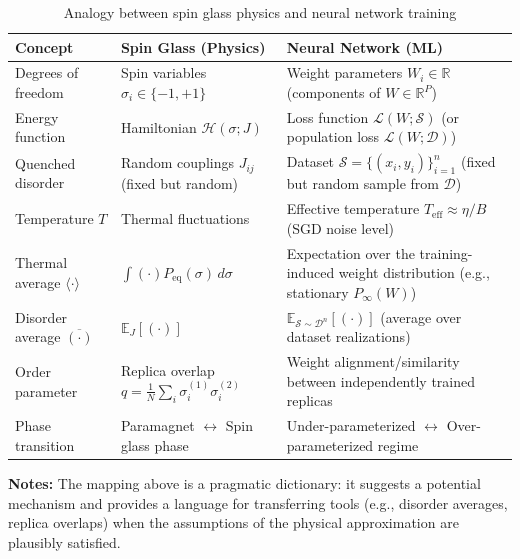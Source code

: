\documentclass[
  journal=largetwo,
  simfonts=false,
  year=2025,
  volume=37,
]{cup-journal}
\begin{document}
\begin{table}[t]
\centering
\footnotesize
\begin{threeparttable}
\caption{Analogy between spin glass physics and neural network training}
\label{tab:spin_glass_nn_analogy}
\begin{tabularx}{\textwidth}{ L{0.25\textwidth} L{0.35\textwidth} >{\RaggedRight\arraybackslash}X }
\toprule
\textbf{Concept} & \textbf{Spin Glass (Physics)} & \textbf{Neural Network (ML)} \\
\midrule
Degrees of freedom & Spin variables $\sigma_i \in \{-1,+1\}$ & Weight parameters $W_i\in\mathbb{R}$ (components of $W\in\mathbb{R}^P$) \\
\addlinespace[1pt]
Energy function & Hamiltonian $\mathcal{H}(\sigma; J)$ & Loss function $\mathcal{L}(W; \mathcal{S})$ (or population loss $\mathcal{L}(W;\mathcal{D})$) \\
\addlinespace[1pt]
Quenched disorder & Random couplings $J_{ij}$ (fixed but random) & Dataset $\mathcal{S}=\{(x_i,y_i)\}_{i=1}^n$ (fixed but random sample from $\mathcal{D}$) \\
\addlinespace[1pt]
Temperature $T$ & Thermal fluctuations & Effective temperature $T_{\text{eff}}\approx\eta/B$ (SGD noise level) \\
\addlinespace[1pt]
Thermal average $\langle\cdot\rangle$ & $\int (\cdot) P_{\text{eq}}(\sigma)\,d\sigma$ & Expectation over the training-induced weight distribution (e.g., stationary $P_\infty(W)$) \\
\addlinespace[1pt]
Disorder average $\overline{(\cdot)}$ & $\mathbb{E}_{J}[(\cdot)]$ & $\mathbb{E}_{\mathcal{S}\sim\mathcal{D}^n}[(\cdot)]$ (average over dataset realizations) \\
\addlinespace[1pt]
Order parameter & Replica overlap $q=\frac{1}{N}\sum_i \sigma_i^{(1)}\sigma_i^{(2)}$ & Weight alignment/similarity between independently trained replicas \\
\addlinespace[1pt]
Phase transition & Paramagnet $\leftrightarrow$ Spin glass phase & Under-parameterized $\leftrightarrow$ Over-parameterized regime \\
\bottomrule
\end{tabularx}

\begin{tablenotes}
\footnotesize
\item[] \textbf{Notes:} The mapping above is a pragmatic dictionary: it suggests a potential mechanism and provides a language for transferring tools (e.g., disorder averages, replica overlaps) when the assumptions of the physical approximation are plausibly satisfied.
\end{tablenotes}
\end{threeparttable}
\end{table}
\end{document}
